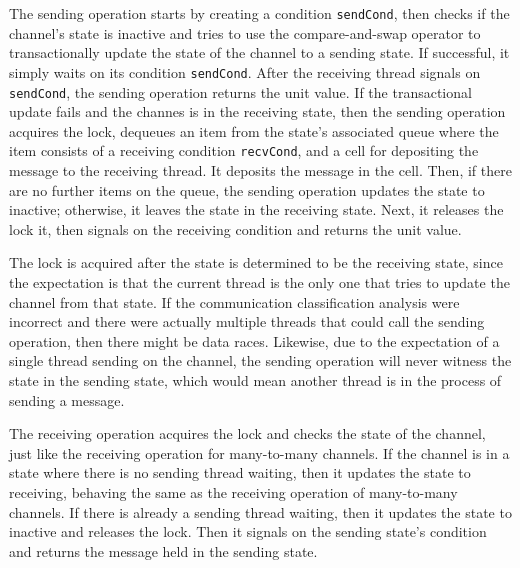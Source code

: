 \documentclass[letterpaper, 11pt]{report}
\begin{document}
The sending operation starts by creating a condition \lstinline{sendCond}, then checks
if the channel's state is inactive and tries to use the
compare-and-swap operator to transactionally update the state of
the channel to a sending state.
If successful, it simply waits on its condition \lstinline{sendCond}.
After the receiving thread signals on \lstinline{sendCond}, the sending operation returns the unit value.
If the transactional update fails and the channes is in the receiving state, then the sending operation acquires the lock, dequeues an item from the state's associated queue where the item consists of a receiving condition \lstinline{recvCond},
and a cell for depositing the message to the receiving thread. It deposits the message in the cell. Then,
if there are no further items on the queue, the sending operation updates the state to inactive;
otherwise, it leaves the state in the receiving state.
Next, it releases the lock it, then signals on the receiving condition and returns the unit value.

The lock is acquired after the state is determined to be the receiving state,
since the expectation is that the current thread is the only one
that tries to update the channel from that state. If the communication classification analysis were
incorrect and there were actually multiple threads that could call the sending operation,
then there might be data races. Likewise, due to the expectation of a single thread
sending on the channel, the sending operation will never witness the state in the sending state,
which would mean another thread is in the process of sending a message.

The receiving operation acquires the lock and checks
the state of the channel, just like the receiving operation for many-to-many channels.
If the channel is in a state where there is no sending thread waiting,
then it updates the state to receiving, behaving the same as the receiving operation of many-to-many channels.
If there is already a sending thread waiting, then it updates the state to inactive and
releases the lock. Then it signals on the sending state's condition and
returns the message held in the sending state.
\end{document}
